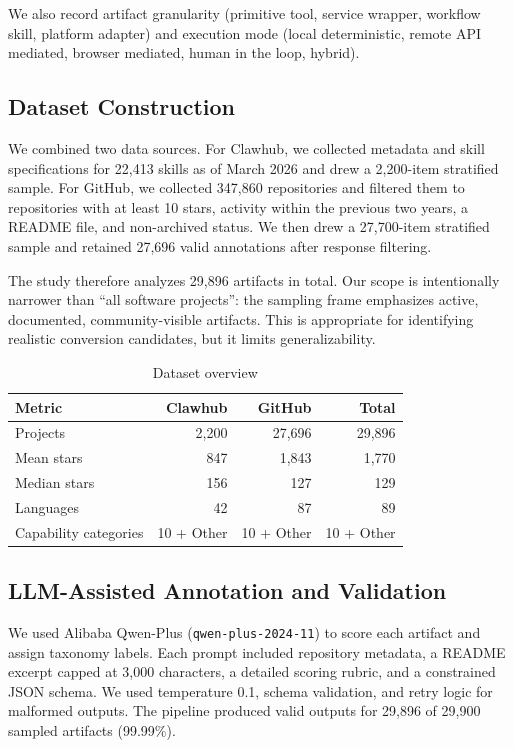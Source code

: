 \documentclass[sigconf,review,anonymous,nonacm]{acmart}
\begin{document}
We also record artifact granularity (primitive tool, service wrapper, workflow skill, platform adapter) and execution mode (local deterministic, remote API mediated, browser mediated, human in the loop, hybrid).

\subsection{Dataset Construction}

We combined two data sources. For Clawhub, we collected metadata and skill specifications for 22,413 skills as of March 2026 and drew a 2,200-item stratified sample. For GitHub, we collected 347,860 repositories and filtered them to repositories with at least 10 stars, activity within the previous two years, a README file, and non-archived status. We then drew a 27,700-item stratified sample and retained 27,696 valid annotations after response filtering.

The study therefore analyzes 29,896 artifacts in total. Our scope is intentionally narrower than ``all software projects'': the sampling frame emphasizes active, documented, community-visible artifacts. This is appropriate for identifying realistic conversion candidates, but it limits generalizability.

\begin{table}[t]
\caption{Dataset overview}
\label{tab:dataset}
\centering
\begin{tabular}{lrrr}
\toprule
Metric & Clawhub & GitHub & Total \\
\midrule
Projects & 2,200 & 27,696 & 29,896 \\
Mean stars & 847 & 1,843 & 1,770 \\
Median stars & 156 & 127 & 129 \\
Languages & 42 & 87 & 89 \\
Capability categories & 10 + Other & 10 + Other & 10 + Other \\
\bottomrule
\end{tabular}
\end{table}

\subsection{LLM-Assisted Annotation and Validation}

We used Alibaba Qwen-Plus (\texttt{qwen-plus-2024-11}) to score each artifact and assign taxonomy labels. Each prompt included repository metadata, a README excerpt capped at 3,000 characters, a detailed scoring rubric, and a constrained JSON schema. We used temperature 0.1, schema validation, and retry logic for malformed outputs. The pipeline produced valid outputs for 29,896 of 29,900 sampled artifacts (99.99\%).
\end{document}
